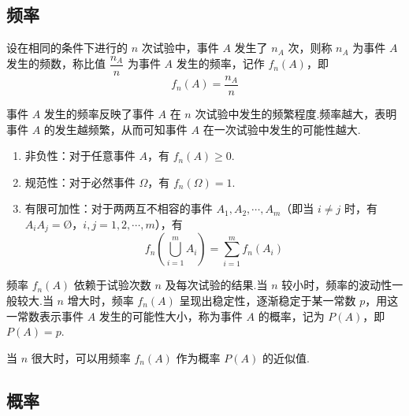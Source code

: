 \subsection{频率}

\begin{definition}
    \indent 设在相同的条件下进行的 $n$ 次试验中，事件 $A$ 发生了 $n_A$ 次，则称 $n_A$ 为事件 $A$ 发生的{\heiti 频数}，称比值 $\dfrac{n_A}{n}$ 为事件 $A$ 发生的{\heiti 频率}，记作 $f_n(A)$，即
    $$
    f_n(A)=\dfrac{n_A}{n}
    $$
\end{definition}

事件 $A$ 发生的频率反映了事件 $A$ 在 $n$ 次试验中发生的频繁程度.频率越大，表明事件 $A$ 的发生越频繁，从而可知事件 $A$ 在一次试验中发生的可能性越大.

\vspace{0.5em}

\begin{property}[][频率的基本性质]
    \begin{enumerate}
        \item {\heiti 非负性}：对于任意事件 $A$，有 $f_n(A) \geqslant 0$.
        \item {\heiti 规范性}：对于必然事件 $\varOmega$，有 $f_n(\varOmega)=1$.
        \item {\heiti 有限可加性}：对于两两互不相容的事件 $A_1,A_2,\cdots,A_m$（即当 $i\not=j$ 时，有 $A_i A_j = \text{\O}$，$i,j=1,2,\cdots,m$），有
        $$
        f_n \left(\bigcup_{i=1}^m A_i \right) = \sum_{i=1}^m f_n(A_i)
        $$
    \end{enumerate}
\end{property}

频率 $f_n(A)$ 依赖于试验次数 $n$ 及每次试验的结果.当 $n$ 较小时，频率的波动性一般较大.当 $n$ 增大时，频率 $f_n(A)$ 呈现出稳定性，逐渐稳定于某一常数 $p$，用这一常数表示事件 $A$ 发生的可能性大小，称为事件 $A$ 的概率，记为 $P(A)$，即 $P(A)=p$.

当 $n$ 很大时，可以用频率 $f_n(A)$ 作为概率 $P(A)$ 的近似值.

\subsection{概率}

